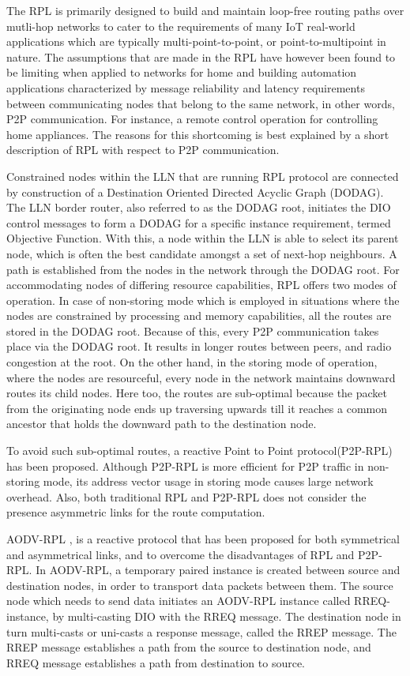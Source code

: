 \documentclass[conference, letterpaper]{IEEEtran}
\begin{document}
The RPL is primarily designed to build and maintain loop-free routing paths over
mutli-hop networks to cater to the requirements of many IoT real-world
applications which are typically multi-point-to-point, or point-to-multipoint in
nature. The assumptions that are made in the RPL have however been found to be
limiting when applied to networks for home and building automation applications
characterized by message reliability and latency requirements between
communicating nodes that belong to the same network, in other words, P2P
communication. For instance, a remote control operation for controlling home
appliances. The reasons for this shortcoming is best explained by a short
description of RPL with respect to P2P communication.

Constrained nodes within the LLN that are running RPL protocol are connected by
construction of a Destination Oriented Directed Acyclic Graph (DODAG). The LLN
border router, also referred to as the DODAG root, initiates the DIO control
messages to form a DODAG for a specific instance requirement, termed Objective
Function. With this, a node within the LLN is able to select its parent node,
which is often the best candidate amongst a set of next-hop neighbours. A path
is established from the nodes in the network through the DODAG root. For
accommodating nodes of differing resource capabilities, RPL offers two modes of
operation. In case of non-storing mode which is employed in situations where the
nodes are constrained by processing and memory capabilities, all the routes are
stored in the DODAG root. Because of this, every P2P communication takes place
via the DODAG root. It results in longer routes between peers, and radio
congestion at the root. On the other hand, in the storing mode of operation,
where the nodes are resourceful, every node in the network maintains downward
routes its child nodes. Here too, the routes are sub-optimal because the packet
from the originating node ends up traversing upwards till it reaches a common
ancestor that holds the downward path to the destination node.

To avoid such sub-optimal routes, a reactive Point to Point \cite{RFC6997}
protocol(P2P-RPL) has been proposed. Although P2P-RPL is more efficient for P2P
traffic in non-storing mode, its address vector usage in storing mode causes
large network overhead.  Also, both traditional RPL and P2P-RPL does not
consider the presence asymmetric links for the route computation.

AODV-RPL \cite{I-D.ietf-roll-aodv-rpl}, is a reactive protocol that has been
proposed for both symmetrical and asymmetrical links, and to overcome the
disadvantages of RPL and P2P-RPL. In AODV-RPL, a temporary paired instance is
created between source and destination nodes, in order to transport data
packets between them. The source node which needs to send data initiates an
AODV-RPL instance called RREQ-instance, by multi-casting DIO with the RREQ
message.  The destination node in turn multi-casts or uni-casts a response
message, called the RREP message. The RREP message establishes a path from the
source to destination node, and RREQ message establishes a path from
destination to source.  
\end{document}
